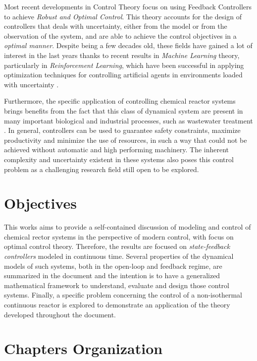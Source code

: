 \documentclass[a4paper,11pt]{book}
\numberwithin{figure}{chapter}
\numberwithin{equation}{chapter}
\numberwithin{table}{chapter}
\theoremstyle{definition}
\begin{document}
Most recent developments in Control Theory focus on using Feedback Controllers to achieve \textit{Robust and Optimal Control}. This theory accounts for the design of controllers that deals with uncertainty, either from the model or from the observation of the system, and are able to achieve the control objectives in a \textit{optimal manner}. Despite being a few decades old, these fields have gained a lot of interest in the last years thanks to recent results in \textit{Machine Learning} theory, particularly in \textit{Reinforcement Learning}, which have been successful in applying optimization techniques for controlling artificial agents in environments loaded with uncertainty \cite{Sutton:2018, Mnih:2015}.

Furthermore, the specific application of controlling chemical reactor systems brings benefits from the fact that this class of dynamical system are present in many important biological and industrial processes, such as wastewater treatment \cite{Mulas:2015, Gupta:2012}. In general, controllers can be used to guarantee safety constraints, maximize productivity and minimize the use of resources, in such a way that could not be achieved without automatic and high performing machinery. The inherent complexity and uncertainty existent in these systems also poses this control problem as a challenging research field still open to be explored.

\section{Objectives}

This works aims to provide a self-contained discussion of modeling and control of chemical rector systems in the perspective of modern control, with focus on optimal control theory. Therefore, the results are focused on \textit{state-feedback controllers} modeled in continuous time. Several properties of the dynamical models of such systems, both in the open-loop and feedback regime, are summarized in the document and the intention is to have a generalized mathematical framework to understand, evaluate and design those control systems. Finally, a specific problem concerning the control of a non-isothermal continuous reactor is explored to demonstrate an application of the theory developed throughout the document.

\section{Chapters Organization}
\end{document}
